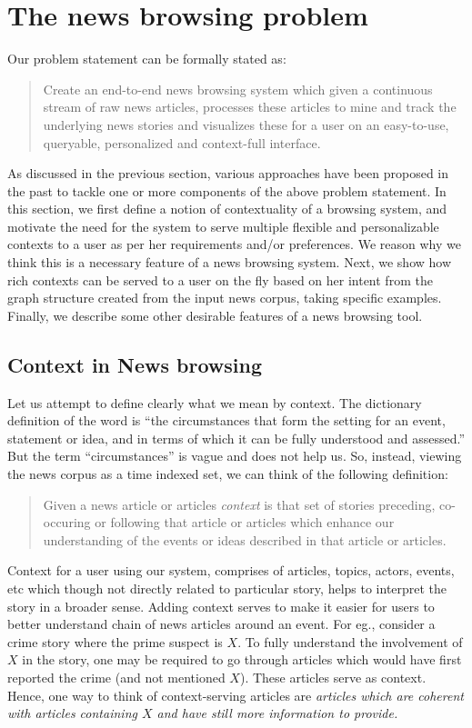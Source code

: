 \section{The news browsing problem}
\label{sec:newsgraph}

Our problem statement can be formally stated as:
\begin{quote}
  Create an end-to-end news browsing system which given a
  continuous stream of raw news articles, processes these articles to
  mine and track the underlying news stories and visualizes these for
  a user on an easy-to-use, queryable, personalized and context-full
  interface.
\end{quote}
As discussed in the previous section, various approaches have been proposed in the past to tackle one or more components of the above problem
statement. In this section, we first define a notion of contextuality of a browsing system, and motivate the need for the system to serve multiple flexible and personalizable contexts to a user as per her
requirements and/or preferences. We reason why we think this is a necessary feature of a news browsing system. Next, we show how rich contexts can be served to a user on the fly based on her intent
from the graph structure created from the input news corpus, taking specific examples. 
Finally, we describe some other desirable features of a news browsing tool. 

\subsection{Context in News browsing}
Let us attempt to define clearly what we mean by context. The
dictionary definition of the word is ``the circumstances that form the
setting for an event, statement or idea, and in terms of which it can
be fully understood and assessed.'' But the term ``circumstances'' is
vague and does not help us. So, instead, viewing the news corpus as a
time indexed set, we can think of the following definition: 
\begin{quote}
Given a news article or articles {\em context} is that set of stories
preceding, co-occuring or following that article or articles which
enhance our understanding of the events or ideas described in that
article or articles.
\end{quote}

Context for a user using our system, comprises of articles, topics,
actors, events, etc which though not directly related to particular
story, helps to interpret the story in a broader sense.  Adding
context serves to make it easier for users to better understand chain
of news articles around an event. For eg., consider a crime story
where the prime suspect is $X$. To fully understand the involvement of $X$ in the story,
one may be required to go through articles which would have first reported the crime (and not 
mentioned $X$). These articles serve as context. Hence, one way to think of context-serving articles
are \emph{articles which are coherent with articles containing $X$ and have still more information to provide.}

